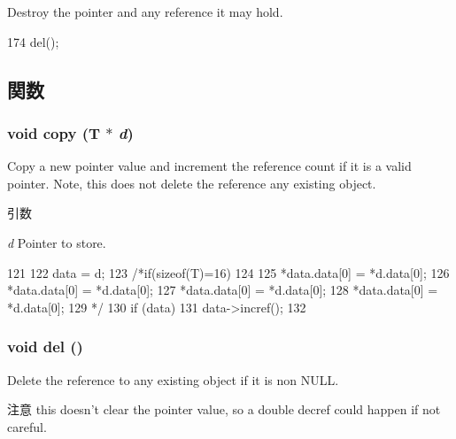 Destroy the pointer and any reference it may hold. 


\begin{DoxyCode}
174 { del(); }
\end{DoxyCode}


\subsection{関数}
\hypertarget{classRefCountingPtr_a890d36110dbb21266898207adfb2a7d5}{
\subsubsection[{copy}]{\setlength{\rightskip}{0pt plus 5cm}void copy (T $\ast$ {\em d})}}
\label{classRefCountingPtr_a890d36110dbb21266898207adfb2a7d5}
Copy a new pointer value and increment the reference count if it is a valid pointer. Note, this does not delete the reference any existing object. 
\begin{DoxyParams}{引数}
\item[{\em d}]Pointer to store. \end{DoxyParams}



\begin{DoxyCode}
121     {
122         data = d;
123         /*if(sizeof(T)=16)
124           {
125             *data.data[0] = *d.data[0];
126             *data.data[0] = *d.data[0];
127             *data.data[0] = *d.data[0];
128             *data.data[0] = *d.data[0];
129             }*/
130         if (data)
131             data->incref();
132     }
\end{DoxyCode}
\hypertarget{classRefCountingPtr_a13120ea5788aaacf44a89b193a0cceef}{
\subsubsection[{del}]{\setlength{\rightskip}{0pt plus 5cm}void del ()}}
\label{classRefCountingPtr_a13120ea5788aaacf44a89b193a0cceef}
Delete the reference to any existing object if it is non NULL. \begin{DoxyAttention}{注意}
this doesn't clear the pointer value, so a double decref could happen if not careful. 
\end{DoxyAttention}



